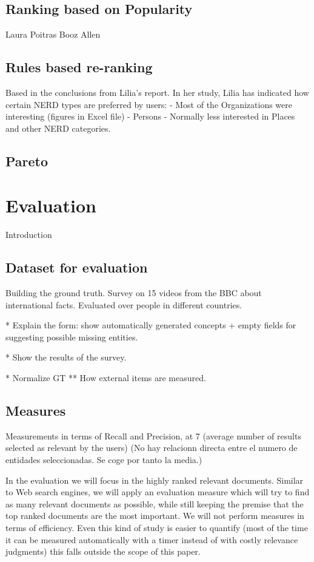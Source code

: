 \documentclass{llncs}
\begin{document}
\subsection{Ranking based on Popularity}
Laura Poitras
Booz Allen


\subsection{Rules based re-ranking}
Based in the conclusions from Lilia's report. In her study, Lilia has indicated how certain NERD types are preferred by users:
- Most of the Organizations were interesting (figures in Excel file)
- Persons 
- Normally less interested in Places and other NERD categories.


\subsection{Pareto}


\section{Evaluation}
\label{sec:Evaluation}

Introduction

\subsection{Dataset for evaluation}
Building the ground truth. Survey on 15 videos from the BBC about international facts. Evaluated over people in different countries.

* Explain the form: show automatically generated concepts + empty fields for suggesting possible missing entities.

* Show the results of the survey.

* Normalize GT
** How external items are measured.

\subsection{Measures}
 
Measurements in terms of Recall and Precision, at 7 (average number of results selected as relevant by the users)
 (No hay relacionn directa entre el numero de entidades seleccionadas. Se coge por tanto la media.)
 
In the evaluation we will focus in the highly ranked relevant documents. Similar to Web search engines, we will apply an evaluation measure which will try to find as many relevant documents as possible, while still keeping the  premise that the top ranked documents are the most important. We will not perform measures in terms of efficiency. Even this kind of study is easier to quantify (most of the time it can be measured automatically with a timer instead of with costly relevance judgments) this falls outside the scope of this paper. 
\end{document}
